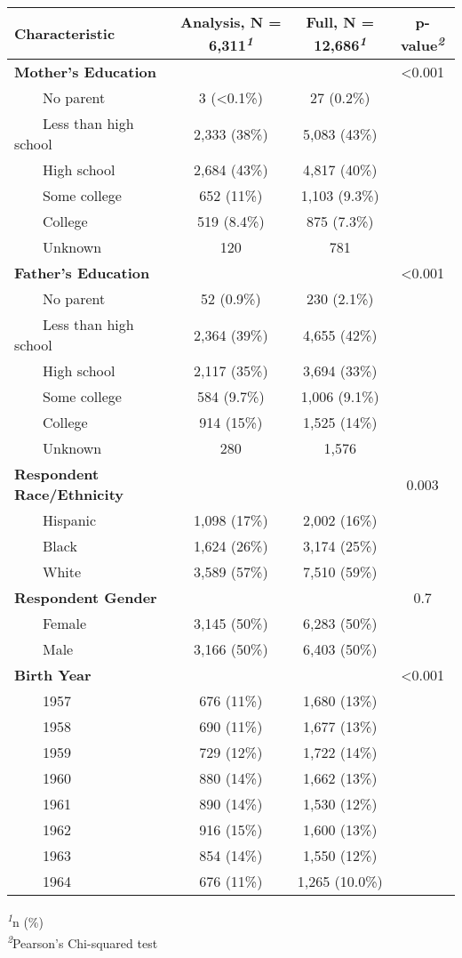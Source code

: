 \setlength{\LTpost}{0mm}
\begin{longtable}{lccc}
\toprule
\textbf{Characteristic} & \textbf{Analysis}, N = 6,311\textsuperscript{\textit{1}} & \textbf{Full}, N = 12,686\textsuperscript{\textit{1}} & \textbf{p-value}\textsuperscript{\textit{2}} \\ 
\midrule\addlinespace[2.5pt]
\textbf{Mother's Education} &  &  & <0.001 \\ 
    No parent & 3 (<0.1\%) & 27 (0.2\%) &  \\ 
    Less than high school & 2,333 (38\%) & 5,083 (43\%) &  \\ 
    High school & 2,684 (43\%) & 4,817 (40\%) &  \\ 
    Some college & 652 (11\%) & 1,103 (9.3\%) &  \\ 
    College & 519 (8.4\%) & 875 (7.3\%) &  \\ 
    Unknown & 120 & 781 &  \\ 
\textbf{Father's Education} &  &  & <0.001 \\ 
    No parent & 52 (0.9\%) & 230 (2.1\%) &  \\ 
    Less than high school & 2,364 (39\%) & 4,655 (42\%) &  \\ 
    High school & 2,117 (35\%) & 3,694 (33\%) &  \\ 
    Some college & 584 (9.7\%) & 1,006 (9.1\%) &  \\ 
    College & 914 (15\%) & 1,525 (14\%) &  \\ 
    Unknown & 280 & 1,576 &  \\ 
\textbf{Respondent Race/Ethnicity} &  &  & 0.003 \\ 
    Hispanic & 1,098 (17\%) & 2,002 (16\%) &  \\ 
    Black & 1,624 (26\%) & 3,174 (25\%) &  \\ 
    White & 3,589 (57\%) & 7,510 (59\%) &  \\ 
\textbf{Respondent Gender} &  &  & 0.7 \\ 
    Female & 3,145 (50\%) & 6,283 (50\%) &  \\ 
    Male & 3,166 (50\%) & 6,403 (50\%) &  \\ 
\textbf{Birth Year} &  &  & <0.001 \\ 
    1957 & 676 (11\%) & 1,680 (13\%) &  \\ 
    1958 & 690 (11\%) & 1,677 (13\%) &  \\ 
    1959 & 729 (12\%) & 1,722 (14\%) &  \\ 
    1960 & 880 (14\%) & 1,662 (13\%) &  \\ 
    1961 & 890 (14\%) & 1,530 (12\%) &  \\ 
    1962 & 916 (15\%) & 1,600 (13\%) &  \\ 
    1963 & 854 (14\%) & 1,550 (12\%) &  \\ 
    1964 & 676 (11\%) & 1,265 (10.0\%) &  \\ 
\bottomrule
\end{longtable}
\begin{minipage}{\linewidth}
\textsuperscript{\textit{1}}n (\%)\\
\textsuperscript{\textit{2}}Pearson's Chi-squared test\\
\end{minipage}

